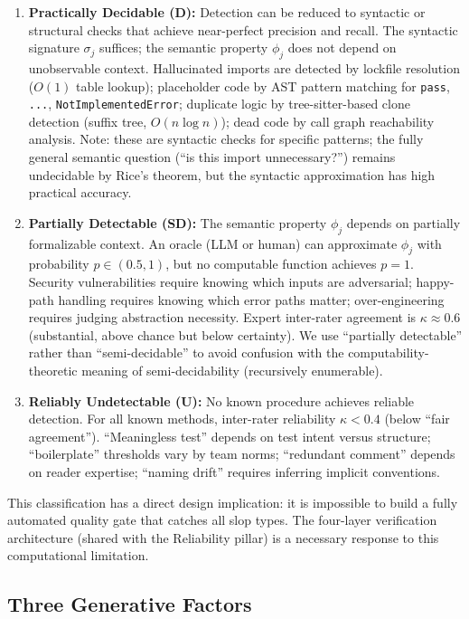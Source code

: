 \documentclass[11pt, a4paper]{googledeepmind}
\begin{document}
\begin{enumerate}
    \item \textbf{Practically Decidable (D):} Detection can be reduced to syntactic or structural checks that achieve near-perfect precision and recall. The syntactic signature $\sigma_j$ suffices; the semantic property $\phi_j$ does not depend on unobservable context. Hallucinated imports are detected by lockfile resolution ($O(1)$ table lookup); placeholder code by AST pattern matching for \texttt{pass}, \texttt{...}, \texttt{NotImplementedError}; duplicate logic by tree-sitter-based clone detection (suffix tree, $O(n \log n)$); dead code by call graph reachability analysis. Note: these are syntactic checks for specific patterns; the fully general semantic question (``is this import unnecessary?'') remains undecidable by Rice's theorem, but the syntactic approximation has high practical accuracy.

    \item \textbf{Partially Detectable (SD):} The semantic property $\phi_j$ depends on partially formalizable context. An oracle (LLM or human) can approximate $\phi_j$ with probability $p \in (0.5, 1)$, but no computable function achieves $p = 1$. Security vulnerabilities require knowing which inputs are adversarial; happy-path handling requires knowing which error paths matter; over-engineering requires judging abstraction necessity. Expert inter-rater agreement is $\kappa \approx 0.6$ (substantial, above chance but below certainty). We use ``partially detectable'' rather than ``semi-decidable'' to avoid confusion with the computability-theoretic meaning of semi-decidability (recursively enumerable).

    \item \textbf{Reliably Undetectable (U):} No known procedure achieves reliable detection. For all known methods, inter-rater reliability $\kappa < 0.4$ (below ``fair agreement''). ``Meaningless test'' depends on test intent versus structure; ``boilerplate'' thresholds vary by team norms; ``redundant comment'' depends on reader expertise; ``naming drift'' requires inferring implicit conventions.
\end{enumerate}

This classification has a direct design implication: it is impossible to build a fully automated quality gate that catches all slop types. The four-layer verification architecture (shared with the Reliability pillar) is a necessary response to this computational limitation.

\subsection{Three Generative Factors}
\end{document}
